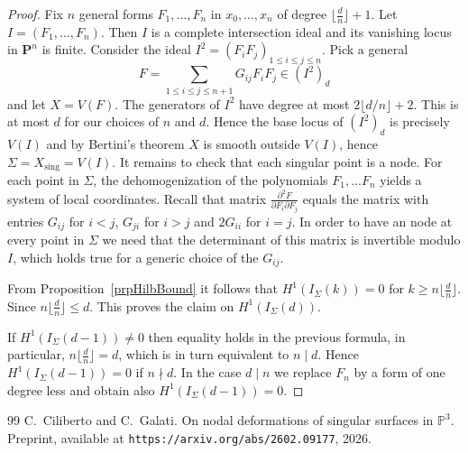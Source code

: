 \documentclass[10pt,a4paper]{amsart}
\newcommand{\Ps}{\mathbf{P}}
\DeclareMathOperator{\sing}{sing}
\begin{document}
\begin{proof}
Fix $n$ general forms $F_1,\dots,F_n$ in $x_0,\dots,x_n$ of degree $\lfloor \frac{d}{n} \rfloor+1$. Let $I=(F_1,\dots,F_{n})$. Then $I$ is a complete intersection ideal and its vanishing locus in $\Ps^n$ is finite.
Consider the ideal  $I^2=(F_iF_j)_{1\leq i\leq j\leq n}$. Pick a general 
\[F=\sum_{1\leq i\leq j \leq n+1} G_{ij}F_iF_j \in (I^2)_d\] and let $X=V(F)$.
The generators of $I^2$ have  degree  at most $2\lfloor d/n \rfloor+2$. This is at most  $d$ for our choices of $n$ and $d$.
Hence the base locus of $(I^2)_d$ is precisely $V(I)$ and by Bertini's theorem $X$ is smooth outside $V(I)$, hence $\Sigma=X_{\sing}=V(I)$. It remains to check that each singular point is a  node. For each point in $\Sigma$, the dehomogenization of the  polynomials $F_1,\dots F_{n}$ yields a  system of local coordinates. Recall that matrix  $\frac{ \partial^2 F}{\partial F_i\partial F_j}$ equals the matrix with entries $G_{ij}$ for $i<j$, $G_{ji}$ for $i>j$ and $2G_{ii}$ for $i=j$.
In order to have an node at every point in $\Sigma$ we need that the determinant of this matrix is invertible modulo $I$, which holds true for a generic choice of the $G_{ij}$.

From Proposition~\ref{prpHilbBound} it follows that $H^1(I_{\Sigma}(k))=0$ for $k\geq n \lfloor \frac{d}{n} \rfloor $. Since $n \lfloor \frac{d}{n} \rfloor\leq d$. This proves the claim on $H^1(I_\Sigma(d))$.
 
 If $H^1(I_{\Sigma}(d-1))\neq 0$ then equality holds in the previous formula, in particular, $n \lfloor \frac{d}{n}\rfloor =d$, which is in turn equivalent to  $n\mid d$. Hence $H^1(I_{\Sigma}(d-1))=0$ if $n\nmid d$. In the case $d\mid n$  we replace $F_{n}$ by a form of one degree less and obtain also  $H^1(I_{\Sigma}(d-1))=0$. 
\end{proof}

\begin{thebibliography}{99}
 C.~Ciliberto and C.~Galati. \newblock On nodal deformations of singular surfaces in $\mathbb{P}^3$. \newblock Preprint, available at \texttt{https://arxiv.org/abs/2602.09177}, 2026.
\end{thebibliography}
\end{document}
